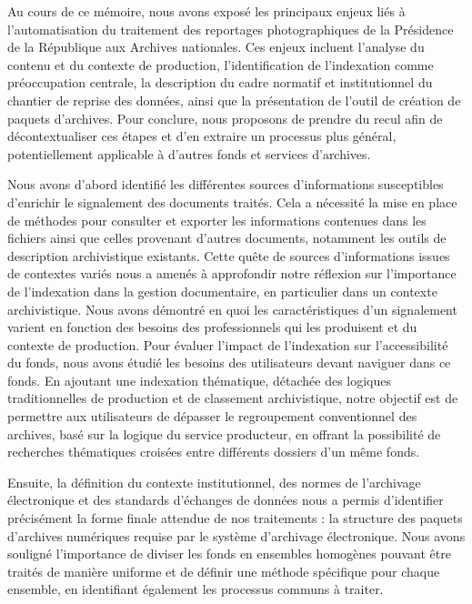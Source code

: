 Au cours de ce mémoire, nous avons exposé les principaux enjeux liés à l'automatisation du traitement des reportages photographiques de la Présidence de la République aux Archives nationales. Ces enjeux incluent l'analyse du contenu et du contexte de production, l'identification de l'indexation comme préoccupation centrale, la description du cadre normatif et institutionnel du chantier de reprise des données, ainsi que la présentation de l'outil de création de paquets d'archives. Pour conclure, nous proposons de prendre du recul afin de décontextualiser ces étapes et d’en extraire un processus plus général, potentiellement applicable à d’autres fonds et services d’archives.

Nous avons d'abord identifié les différentes sources d'informations susceptibles d'enrichir le signalement des documents traités. Cela a nécessité la mise en place de méthodes pour consulter et exporter les informations contenues dans les fichiers ainsi que celles provenant d'autres documents, notamment les outils de description archivistique existants. Cette quête de sources d'informations issues de contextes variés nous a amenés à approfondir notre réflexion sur l'importance de l'indexation dans la gestion documentaire, en particulier dans un contexte archivistique. Nous avons démontré en quoi les caractéristiques d’un signalement varient en fonction des besoins des professionnels qui les produisent et du contexte de production. Pour évaluer l’impact de l’indexation sur l’accessibilité du fonds, nous avons étudié les besoins des utilisateurs devant naviguer dans ce fonds. En ajoutant une indexation thématique, détachée des logiques traditionnelles de production et de classement archivistique, notre objectif est de permettre aux utilisateurs de dépasser le regroupement conventionnel des archives, basé sur la logique du service producteur, en offrant la possibilité de recherches thématiques croisées entre différents dossiers d’un même fonds.

Ensuite, la définition du contexte institutionnel, des normes de l’archivage électronique et des standards d’échanges de données nous a permis d’identifier précisément la forme finale attendue de nos traitements : la structure des paquets d’archives numériques requise par le système d’archivage électronique. Nous avons souligné l’importance de diviser les fonds en ensembles homogènes pouvant être traités de manière uniforme et de définir une méthode spécifique pour chaque ensemble, en identifiant également les processus communs à traiter.

